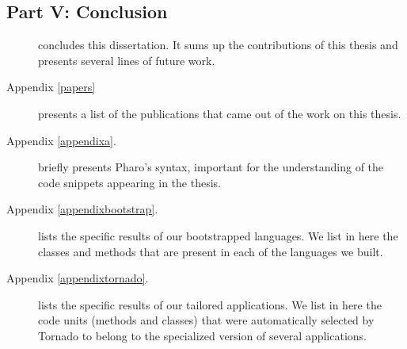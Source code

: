 \subsection{Part V: Conclusion}

\begin{description}

\item[] concludes this dissertation. It sums up the contributions of this thesis and presents several lines of future work.

\item[Appendix \ref{papers}] presents a list of the publications that came out of the work on this thesis.

\item[Appendix \ref{appendixa}.] briefly presents Pharo's syntax, important for the understanding of the code snippets appearing in the thesis.

\item[Appendix \ref{appendixbootstrap}.] lists the specific results of our bootstrapped languages. We list in here the classes and methods that are present in each of the languages we built.

\item[Appendix \ref{appendixtornado}.] lists the specific results of our tailored applications. We list in here the code units (methods and classes) that were automatically selected by Tornado to belong to the specialized version of several applications.

\end{description}


